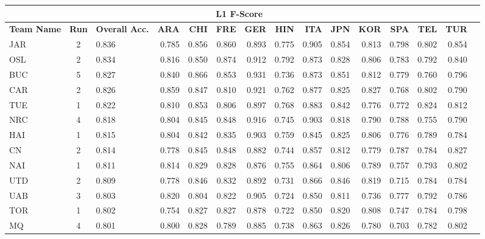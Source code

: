 \documentclass[11pt,letterpaper]{article}
\begin{document}
\begin{table*}[!htbp]
\begin{footnotesize}
\begin{tabular}{|p{1cm}|c|p{1cm}|r|r|r|r|r|r|r|r|r|r|r|r|}
\hline
\rowcolor{gray!50}
\multicolumn{3}{|c|}{} & \multicolumn{11}{c|}{\bf L1 F-Score}\\\hline
{\bf Team Name} & {\bf Run} & {\bf Overall Acc.} & {\bf ARA} & {\bf CHI} & {\bf FRE} & {\bf GER} & {\bf HIN} & {\bf ITA} & {\bf JPN} & {\bf KOR} & {\bf SPA} & {\bf TEL} & {\bf TUR}\\\hline
  JAR & 2  & 0.836 & 0.785 & 0.856 & 0.860 & 0.893 & 0.775 & 0.905 & 0.854 & 0.813 & 0.798 & 0.802 & 0.854\\\hline
OSL   & 2  & 0.834 & 0.816 & 0.850 & 0.874 & 0.912 & 0.792 & 0.873 & 0.828 & 0.806 & 0.783 & 0.792 & 0.840\\\hline
 BUC  & 5  & 0.827 & 0.840 & 0.866 & 0.853 & 0.931 & 0.736 & 0.873 & 0.851 & 0.812 & 0.779 & 0.760 & 0.796\\\hline
CAR   & 2  & 0.826 & 0.859 & 0.847 & 0.810 & 0.921 & 0.762 & 0.877 & 0.825 & 0.827 & 0.768 & 0.802 & 0.790\\\hline
  TUE & 1  & 0.822 & 0.810 & 0.853 & 0.806 & 0.897 & 0.768 & 0.883 & 0.842 & 0.776 & 0.772 & 0.824 & 0.812\\\hline
 NRC  & 4  & 0.818 & 0.804 & 0.845 & 0.848 & 0.916 & 0.745 & 0.903 & 0.818 & 0.790 & 0.788 & 0.755 & 0.790\\\hline
HAI   & 1  & 0.815 & 0.804 & 0.842 & 0.835 & 0.903 & 0.759 & 0.845 & 0.825 & 0.806 & 0.776 & 0.789 & 0.784\\\hline
 CN  & 2  & 0.814 & 0.778 & 0.845 & 0.848 & 0.882 & 0.744 & 0.857 & 0.812 & 0.779 & 0.787 & 0.784 & 0.827\\\hline
 NAI  & 1  & 0.811 & 0.814 & 0.829 & 0.828 & 0.876 & 0.755 & 0.864 & 0.806 & 0.789 & 0.757 & 0.793 & 0.802\\\hline
 UTD  & 2  & 0.809 & 0.778 & 0.846 & 0.832 & 0.892 & 0.731 & 0.866 & 0.846 & 0.819 & 0.715 & 0.784 & 0.784\\\hline
 UAB  & 3  & 0.803 & 0.820 & 0.804 & 0.822 & 0.905 & 0.724 & 0.850 & 0.811 & 0.736 & 0.777 & 0.792 & 0.786\\\hline
 TOR  & 1  & 0.802 & 0.754 & 0.827 & 0.827 & 0.878 & 0.722 & 0.850 & 0.820 & 0.808 & 0.747 & 0.784 & 0.798\\\hline
  MQ & 4  & 0.801 & 0.800 & 0.828 & 0.789 & 0.885 & 0.738 & 0.863 & 0.826 & 0.780 & 0.703 & 0.782 & 0.802\\\hline

\end{tabular}
\end{footnotesize}
\end{table*}
\end{document}
